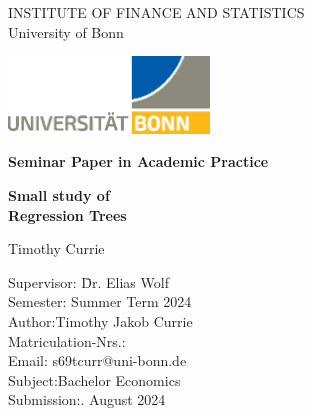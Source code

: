 \thispagestyle{empty}

\begin{center}

\vspace*{-8mm}

{\LARGE INSTITUTE OF FINANCE AND STATISTICS\\[1mm]}
\large University of Bonn\\

\vspace*{1cm}

\includegraphics[width=0.4\textwidth]{./Graphics/UNI_Bonn_Logo_Standard_RZ.eps}

\vspace*{1cm}

{\Large \textbf{Seminar Paper in Academic Practice}}\\ 

\vspace{1cm}

{\Large \textbf{Small study of}}\\ 
\vspace*{1mm}
{\Large \textbf{Regression Trees}}\\ 

\vspace{1.5cm}

{\LARGE Timothy Currie}\\[15mm]

\parbox{120mm}{
\begin{large}
\begin{tabbing}
Supervisor: \hspace{1.8cm} \= Dr. Elias Wolf\\[1.5mm]
Semester:\> Summer Term 2024\\[1.5mm]
Author:\>Timothy Jakob Currie\\[1.5mm] %
Matriculation-Nrs.:\\[1.5mm]
Email:\> s69tcurr@uni-bonn.de\\[1.5mm]
Subject:\>Bachelor Economics\\[1.5mm]
Submission:. August 2024\\[1.5mm]
\end{tabbing}
\end{large}
}

\end{center}
\clearpage{\pagestyle{empty}\cleardoublepage}
